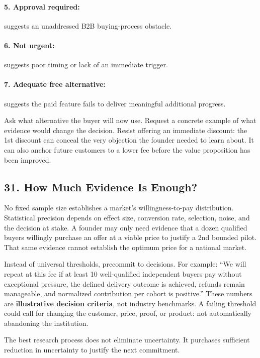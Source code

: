 \paragraph*{5. Approval required:} suggests an unaddressed B2B buying-process obstacle.
\paragraph*{6. Not urgent:} suggests poor timing or lack of an immediate trigger.
\paragraph*{7. Adequate free alternative:} suggests the paid feature fails to deliver meaningful additional progress.

Ask what alternative the buyer will now use. Request a concrete example of what evidence would change the decision. Resist offering an immediate discount: the 1st discount can conceal the very objection the founder needed to learn about. It can also anchor future customers to a lower fee before the value proposition has been improved.

\subsection*{31. How Much Evidence Is Enough?}

No fixed sample size establishes a market's willingness-to-pay distribution. Statistical precision depends on effect size, conversion rate, selection, noise, and the decision at stake. A founder may only need evidence that a dozen qualified buyers willingly purchase an offer at a viable price to justify a 2nd bounded pilot. That same evidence cannot establish the optimum price for a national market.

Instead of universal thresholds, precommit to decisions. For example: ``We will repeat at this fee if at least 10 well-qualified independent buyers pay without exceptional pressure, the defined delivery outcome is achieved, refunds remain manageable, and normalized contribution per cohort is positive.'' These numbers are \textbf{illustrative decision criteria}, not industry benchmarks. A failing threshold could call for changing the customer, price, proof, or product: not automatically abandoning the institution.

The best research process does not eliminate uncertainty. It purchases sufficient reduction in uncertainty to justify the next commitment.
